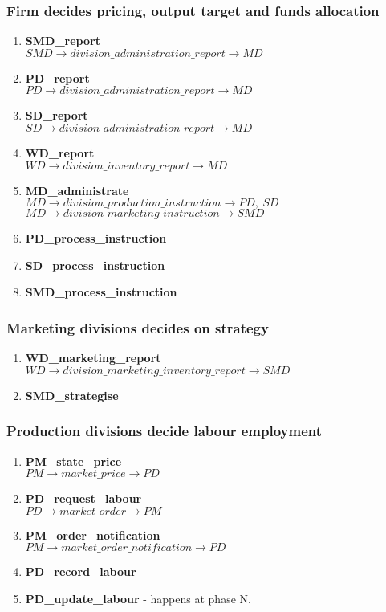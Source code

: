 \documentclass[11pt]{article}
\begin{document}
\subsubsection{Firm decides pricing, output target and funds allocation}
\begin{enumerate}
	\item \textbf{SMD\_report} \\
	$ SMD \rightarrow division\_administration\_report \rightarrow MD $
	\item \textbf{PD\_report} \\
	$ PD \rightarrow division\_administration\_report \rightarrow MD $
	\item \textbf{SD\_report} \\
	$ SD \rightarrow division\_administration\_report \rightarrow MD $
	\item \textbf{WD\_report} \\
	$ WD \rightarrow division\_inventory\_report \rightarrow MD $
	\item \textbf{MD\_administrate} \\
	$ MD \rightarrow division\_production\_instruction \rightarrow PD,\ SD $ \\
	$ MD \rightarrow division\_marketing\_instruction \rightarrow SMD $
	\item \textbf{PD\_process\_instruction}
	\item \textbf{SD\_process\_instruction}
	\item \textbf{SMD\_process\_instruction}
\end{enumerate}

\subsubsection{Marketing divisions decides on strategy}
\begin{enumerate}
	\item \textbf{WD\_marketing\_report} \\
	$ WD \rightarrow division\_marketing\_inventory\_report \rightarrow SMD $
	\item \textbf{SMD\_strategise}
\end{enumerate}

\subsubsection{Production divisions decide labour employment}
\begin{enumerate}
	\item \textbf{PM\_state\_price} \\
	$ PM \rightarrow market\_price \rightarrow PD $
	\item \textbf{PD\_request\_labour} \\
	$ PD \rightarrow market\_order \rightarrow PM $
	\item \textbf{PM\_order\_notification} \\
	$ PM \rightarrow market\_order\_notification \rightarrow PD $
	\item \textbf{PD\_record\_labour}
	\item \textbf{PD\_update\_labour} - happens at phase N.
\end{enumerate}
\end{document}
